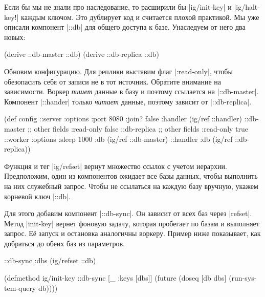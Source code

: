 Если бы мы не знали про наследование, то расширили бы \spverb|ig/init-key| и
\spverb|ig/halt-key!| каждым ключом. Это дублирует код и считается плохой
практикой. Мы уже описали компонент \spverb|::db| для общего доступа к
базе. Унаследуем от него два новых:

\begin{english}
  \begin{clojure}
(derive ::db-master ::db)
(derive ::db-replica ::db)
  \end{clojure}
\end{english}

Обновим конфигурацию. Для реплики выставим флаг \spverb|:read-only|, чтобы
обезопасить себя от записи не в тот источник. Обратите внимание на
зависимости. Воркер \emph{пишет} данные в базу и поэтому ссылается на
\spverb|::db-master|. Компонент \spverb|::hander| только \emph{читает} данные,
поэтому зависит от \spverb|::db-replica|.

\begin{english}
  \begin{clojure}
(def config
  {::server {:options {:port 8080 :join? false}
             :handler (ig/ref ::handler)}
   ::db-master {;; other fields
                :read-only false}
   ::db-replica {;; other fields
                 :read-only true}
   ::worker {:options {:sleep 1000}
             :db (ig/ref ::db-master)}
   ::handler {:db (ig/ref ::db-replica)}})
  \end{clojure}
\end{english}

Функция и тег \spverb|ig/refset| вернут множество ссылок с учетом
иерархии. Предположим, один из компонентов ожидает все базы данных, чтобы
выполнить на них служебный запрос. Чтобы не ссылаться на каждую базу вручную,
укажем корневой ключ \spverb|::db|.

Для этого добавим компонент \spverb|::db-sync|. Он зависит от всех баз через
\spverb|refset|. Метод \spverb|init-key| вернет фоновую задачу, которая
пробегает по базам и выполняет запрос. Е\"{е} запуск и остановка аналогичны
воркеру. Пример ниже показывает, как добраться до обеих баз из параметров.

\begin{english}
  \begin{clojure}
{::db-sync {:dbs (ig/refset ::db)}}

(defmethod ig/init-key ::db-sync
  [_ {:keys [dbs]}]
  (future
    (doseq [db dbs]
      (run-system-query db))))
  \end{clojure}
\end{english}

